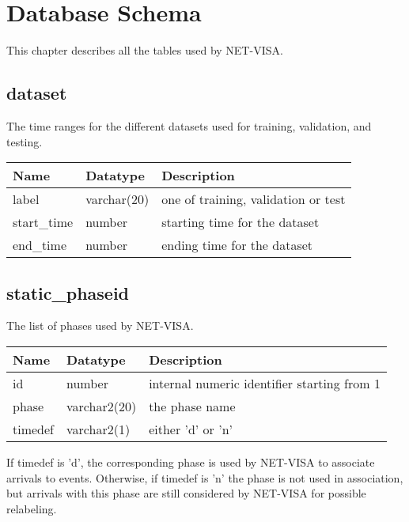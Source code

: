 
\chapter{Database Schema}

This chapter describes all the tables used by NET-VISA.

\section{dataset}\label{tbl-dataset}

The time ranges for the different datasets used for training,
validation, and testing.

\begin{center}
\begin{tabular}{|l|l|l|}
\hline
\bf{Name} & \bf{Datatype} & \bf{Description} \\
\hline
label & varchar(20) & one of training, validation or test \\
start\_time & number & starting time for the dataset \\
end\_time & number & ending time for the dataset \\
\hline
\end{tabular}
\end{center}

\section{static\_phaseid}\label{tbl-static-phaseid}

The list of phases used by NET-VISA.

\begin{center}
\begin{tabular}{|l|l|l|}
\hline
\bf{Name} & \bf{Datatype} & \bf{Description} \\
\hline
id & number & internal numeric identifier starting from 1\\
phase & varchar2(20) & the phase name \\
timedef & varchar2(1) & either 'd' or 'n' \\
\hline
\end{tabular}
\end{center}
If timedef is 'd', the corresponding phase is used by NET-VISA to
associate arrivals to events. Otherwise, if timedef is 'n' the phase is
not used in association, but arrivals with this phase are still
considered by NET-VISA for possible relabeling.


